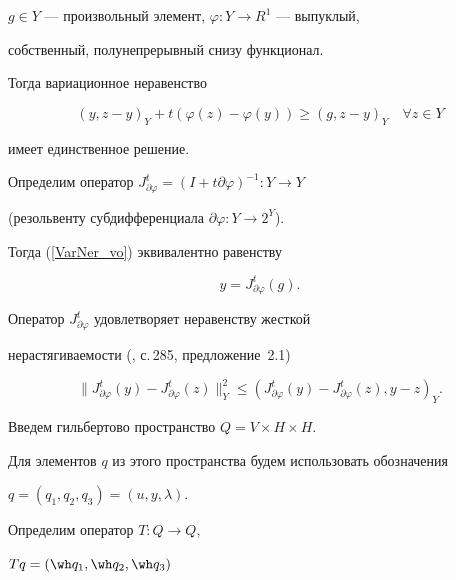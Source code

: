 $g \in Y$ --- произвольный элемент, $ \varphi : Y \to R^1$ --- выпуклый,


собственный, полунепрерывный снизу функционал. 


Тогда вариационное неравенство


\begin{equation}


(y , z-y)_Y +t (\varphi (z)-\varphi (y)) \geq


(g , z-y)_Y \quad \forall z \in Y


\label{VarNer_vo}


\end{equation}


имеет единственное решение.


Определим оператор $J_{\partial \varphi}^{t}= (I+t \partial \varphi)^{-1}: Y \to Y$


(резольвенту субдифференциала $\partial \varphi : Y \to 2^Y$).


Тогда (\ref{VarNer_vo}) эквивалентно равенству


\begin{equation}


y=J_{\partial \varphi}^{t}(g).


\label{JFi_alp}


\end{equation}


Оператор $J_{\partial \varphi}^{t}$ удовлетворяет неравенству жесткой 


нерастягиваемости (\cite{FG_83}, с.\,285, предложение~2.1)


\begin{equation}


\| J_{\partial \varphi}^{t}(y)-J_{\partial \varphi}^{t}(z) \|_Y^2 \leq


(J_{\partial \varphi}^{t}(y)-J_{\partial \varphi}^{t}(z) , y-z)_Y .


\label{MonJFi_alp}


\end{equation}





Введем гильбертово пространство $Q=V \times H \times H$.


Для элементов $q$ из этого пространства будем использовать обозначения


$q=(q_1,q_2,q_3)=(u, y,\lambda)$. 


Определим оператор $T: Q \to Q$, 


$Tq =(\wh q_1, \wh q_2, \wh q_3)$


